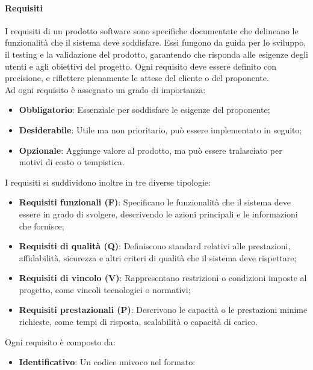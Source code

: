 \documentclass[10pt]{article}
\begin{document}
\begin{justify}
        \paragraph{Requisiti}
        I requisiti di un prodotto software sono specifiche documentate che delineano le funzionalità che il sistema deve soddisfare. Essi fungono da guida per lo sviluppo, il testing e la validazione del prodotto, garantendo che risponda alle esigenze degli utenti e agli obiettivi del progetto. Ogni requisito deve essere definito con precisione, e riflettere pienamente le attese del cliente o del proponente.\\
        Ad ogni requisito è assegnato un grado di importanza:
        \begin{itemize}
            \item \textbf{Obbligatorio}: Essenziale per soddisfare le esigenze del proponente;
            \item \textbf{Desiderabile}: Utile ma non prioritario, può essere implementato in seguito;
            \item \textbf{Opzionale}: Aggiunge valore al prodotto, ma può essere tralasciato per motivi di costo o tempistica.
        \end{itemize}
        I requisiti si suddividono inoltre in tre diverse tipologie:
        \begin{itemize}
            \item \textbf{Requisiti funzionali (F)}: Specificano le funzionalità che il sistema deve essere in grado di svolgere, descrivendo le azioni principali e le informazioni che fornisce;
            \item \textbf{Requisiti di qualità (Q)}: Definiscono standard relativi alle prestazioni, affidabilità, sicurezza e altri criteri di qualità che il sistema deve rispettare;
            \item \textbf{Requisiti di vincolo (V)}: Rappresentano restrizioni o condizioni imposte al progetto, come vincoli tecnologici o normativi;
            \item \textbf{Requisiti prestazionali (P)}: Descrivono le capacità o le prestazioni minime richieste, come tempi di risposta, scalabilità o capacità di carico.
        \end{itemize}
        Ogni requisito è composto da:
        \begin{itemize}
            \item \textbf{Identificativo}: Un codice univoco nel formato:
            \begin{quote}

\end{quote}
\end{itemize}
\end{justify}
\end{document}
